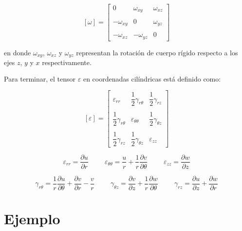 \documentclass[../notas medios.tex]{subfiles}
\begin{document}
\[	
[\omega] =
\begin{bmatrix}
	0 & \omega_{xy}  &  \omega_{xz} \\\\
	 -\omega_{xy}  & 0 &  \omega_{yz} \\\\ 
	 -\omega_{xz}  & -\omega_{yz}  &  0
\end{bmatrix}\] 

en donde $\omega_{xy}$, $\omega_{xz}$ y  $\omega_{yz}$ representan la rotación de cuerpo rígido respecto a los ejes $z$, $y$ y $x$ respectivamente. 


Para terminar, el tensor $\varepsilon$ en coordenadas cilíndricas está definido como:  

\[	
[\varepsilon] =
\begin{bmatrix}
	\varepsilon_{rr} & \dfrac{1}{2} \gamma_{r\theta} & \dfrac{1}{2} \gamma_{rz}  \\\\
	\dfrac{1}{2} \gamma_{r\theta}  & \varepsilon_{{\theta}{\theta}} & \dfrac{1}{2}  \gamma_{{\theta}z}  \\\\
	 \dfrac{1}{2} \gamma_{rz} & \dfrac{1}{2} \gamma_{{\theta}z}  &  \varepsilon_{zz}
\end{bmatrix}\]


\begin{equation*}	
	\varepsilon_{rr} = \dfrac{\partial u}{\partial r}
	\hspace{1cm}
	\varepsilon_{\theta \theta} = \dfrac{u}{r} + \dfrac{1}{r} \dfrac{\partial v}{\partial \theta}
	\hspace{1cm}
	\varepsilon_{zz} = \dfrac{\partial w}{\partial z} 
\end{equation*}

\begin{equation*}	
	\gamma_{r \theta} = \dfrac{1}{r} \dfrac{\partial u}{\partial \theta} + \dfrac{\partial v}{\partial r} - \dfrac{v}{r} 
	\hspace{1cm}
	\gamma_{\theta z} = \dfrac{\partial v}{\partial z} + \dfrac{1}{r} \dfrac{\partial w}{\partial \theta} 
	\hspace{1cm}
	\gamma_{rz}	 = \dfrac{\partial u}{\partial z} + \dfrac{\partial w}{\partial r}
\end{equation*}

\section*{Ejemplo}
\end{document}
